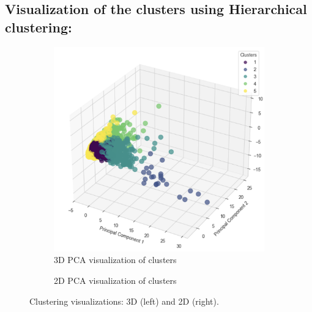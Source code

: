 \subsection{Visualization of the clusters using Hierarchical clustering:}
\begin{figure}[H]
    \centering
    \begin{subfigure}[b]{0.45\textwidth}
        \centering
        \includegraphics[width=\textwidth]{src/figs/3d_PCA_HC.png}
        \caption{3D PCA visualization of clusters}
        \label{fig:3D_pca}
    \end{subfigure}
    \hfill
    \begin{subfigure}[b]{0.45\textwidth}
        \centering
        \caption{2D PCA visualization of clusters}
        \label{fig:PCA_2d}
    \end{subfigure}
    \caption{Clustering visualizations: 3D (left) and 2D (right).}
    \label{fig:comparison1}
\end{figure}


